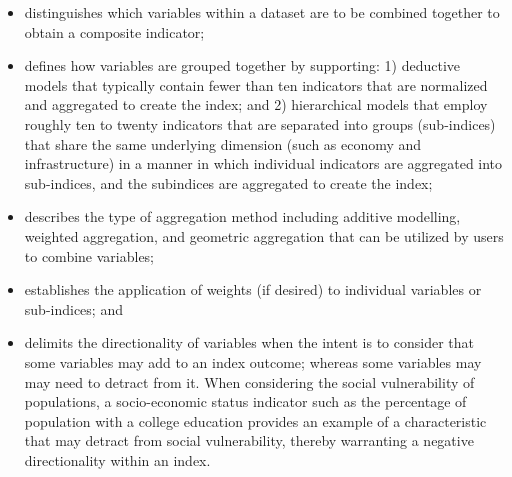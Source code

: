\begin{itemize}
    \item distinguishes which variables within a dataset are to be combined
        together to obtain a composite indicator;
    \item defines how variables are grouped together by supporting: 1)
        deductive models that typically contain fewer than ten indicators that
        are normalized and aggregated to create the index;  and 2) hierarchical
        models that employ roughly ten to twenty indicators that are separated
        into groups (sub-indices) that share the same underlying dimension
        (such as economy and infrastructure) in a manner in which individual
        indicators are aggregated into sub-indices, and the subindices are
        aggregated to create the index;
    \item describes  the type of aggregation method including additive
        modelling, weighted aggregation, and geometric aggregation that can be
        utilized by users to combine variables;
    \item establishes the application of weights (if desired) to individual
        variables or sub-indices; and
    \item delimits the directionality of variables when the intent is to
        consider that some variables may add to an index outcome; whereas some
        variables may may need to detract from it. When considering the social
        vulnerability of populations, a socio-economic status indicator such as
        the percentage of population with a college education provides an
        example of a characteristic that may detract from social vulnerability,
        thereby warranting a negative directionality within an index.
\end{itemize}
